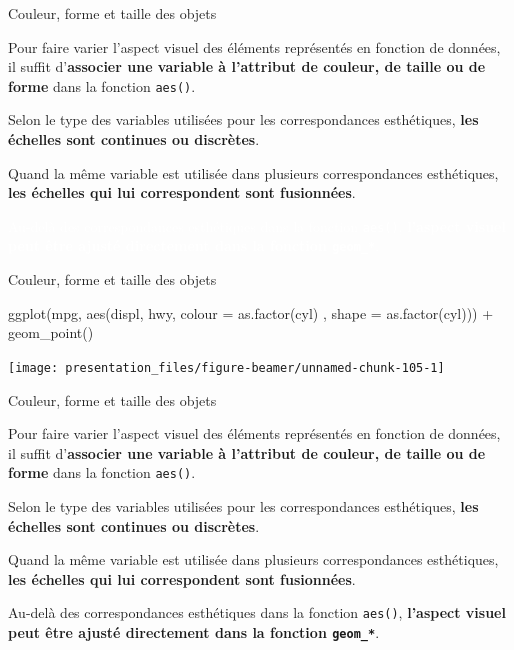 \documentclass[12pt,handout,ignorenonframetext,]{beamer}
\newenvironment{Shaded}{}{}
\newcommand{\KeywordTok}[1]{\textcolor[rgb]{0.00,0.00,1.00}{#1}}
\newcommand{\DataTypeTok}[1]{#1}
\newcommand{\StringTok}[1]{\textcolor[rgb]{0.00,0.50,0.50}{#1}}
\newcommand{\OperatorTok}[1]{#1}
\newcommand{\NormalTok}[1]{#1}
\renewenvironment{Shaded}{\begin{snugshade}}{\end{snugshade}}
\begin{document}
\begin{frame}{Couleur, forme et taille des objets}

Pour faire varier l'aspect visuel des éléments représentés en fonction
de données, il suffit
d'\textbf{associer une variable à l'attribut de couleur, de taille ou de forme}
dans la fonction \texttt{aes()}.

Selon le type des variables utilisées pour les correspondances
esthétiques, \textbf{les échelles sont continues ou discrètes}.

Quand la même variable est utilisée dans plusieurs correspondances
esthétiques,
\textbf{les échelles qui lui correspondent sont fusionnées}.

\textcolor{white}{Au-delà des correspondances esthétiques dans la fonction \texttt{aes()}, \textbf{l'aspect visuel peut être ajusté directement dans la fonction \texttt{geom\_*}}.}

\end{frame}

\begin{frame}[fragile]{Couleur, forme et taille des objets}

\footnotesize \center

\begin{Shaded}
\begin{Highlighting}[]
\KeywordTok{ggplot}\NormalTok{(mpg, }\KeywordTok{aes}\NormalTok{(displ, hwy, }\DataTypeTok{colour =} \KeywordTok{as.factor}\NormalTok{(cyl)}
\NormalTok{  , }\DataTypeTok{shape =} \KeywordTok{as.factor}\NormalTok{(cyl))) }\OperatorTok{+}
\StringTok{  }\KeywordTok{geom_point}\NormalTok{()}
\end{Highlighting}
\end{Shaded}

\texttt{[image: presentation\_files/figure-beamer/unnamed-chunk-105-1]}

\end{frame}

\begin{frame}{Couleur, forme et taille des objets}

Pour faire varier l'aspect visuel des éléments représentés en fonction
de données, il suffit
d'\textbf{associer une variable à l'attribut de couleur, de taille ou de forme}
dans la fonction \texttt{aes()}.

Selon le type des variables utilisées pour les correspondances
esthétiques, \textbf{les échelles sont continues ou discrètes}.

Quand la même variable est utilisée dans plusieurs correspondances
esthétiques,
\textbf{les échelles qui lui correspondent sont fusionnées}.

Au-delà des correspondances esthétiques dans la fonction \texttt{aes()},
\textbf{l'aspect visuel peut être ajusté directement dans la fonction \texttt{geom\_*}}.

\end{frame}
\end{document}
